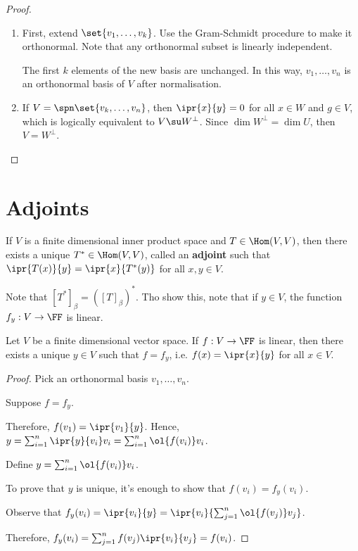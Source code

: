 \documentclass[11pt]{scrartcl}
\begin{document}
\begin{proof}
  \begin{enumerate}[label=\alph*)]
  \item 
  
  First, extend $\set{v_1, \dots, v_k}$. Use the Gram-Schmidt procedure to make it orthonormal. Note that any orthonormal subset is linearly independent.

  The first $k$ elements of the new basis are unchanged. In this way, $v_1, \dots, v_n$ is an orthonormal basis of $V$ after normalisation.
\item If $V = \spn\set{v_k, \dots, v_n}$, then $\ipr{x}{y} = 0$ for all $x\in W$ and $g\in V$, which is logically equivalent to $V\su W^{\bot}$.
  Since $\dim W^{\bot} = \dim U$, then $V = W^{\bot}$.
    \end{enumerate}
\end{proof}

\section{Adjoints}

If $V$ is a finite dimensional inner product space and
$T \in \Hom(V,V)$, then there exists a unique $T^{*}\in \Hom(V,V)$,
called an \textbf{adjoint} such that
$\ipr{T(x)}{y} = \ipr{x}{T^{*}(y)}$ for all $x, y \in V$.

Note that $[T^{*}]_{\beta} = ([T]_{\beta})^{*}$. Tho show this, note
that if $y\in V$, the function $f_y: V\to \FF$ is linear.

\begin{theorem}
  Let $V$ be a finite dimensional vector space. If $f: V \to \FF$ is
  linear, then there exists a unique $y\in V$ such that $f = f_y$, i.e. $f(x) = \ipr{x}{y}$ for all $x \in V$.
\end{theorem}

\begin{proof}
  Pick an orthonormal basis $v_1,\dots, v_n$.

  Suppose $f = f_y$.

  Therefore, $f(v_1) = \ipr{v_1}{y}$. Hence,
  $y = \sum_{i=1}^n \ipr{y}{v_i}v_i = \sum_{i=1}^n \ol{f(v_i)}v_{i}$.

  Define $y = \sum_{i=1}^n\ol{f(v_i)}v_i$.

  To prove that $y$ is unique, it's enough to show that $f(v_i) = f_y(v_i)$.

  Observe that $f_y(v_i) = \ipr{v_i}{y} = \ipr{v_i}{\sum_{j=1}^n\ol{f(v_j)}v_j}$.

  Therefore, $f_y(v_i) = \sum_{j=1}^nf(v_j)\ipr{v_i}{v_j} = f(v_i)$.
\end{proof}
\end{document}
